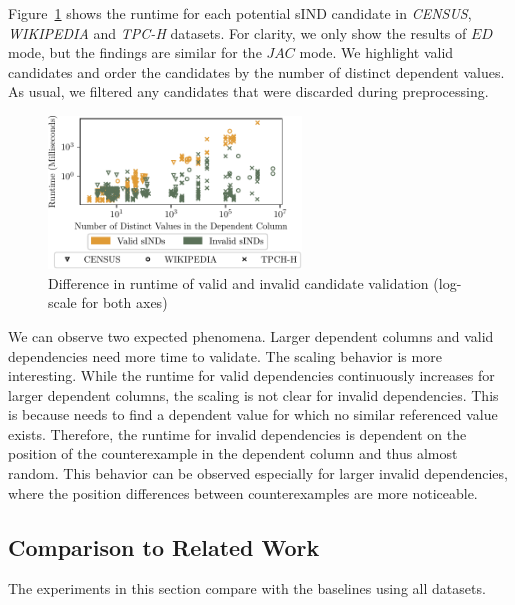 Figure~\ref{fig:eval:valid_dependencies} shows the runtime for each potential sIND candidate in \emph{CENSUS}, \emph{WIKIPEDIA} and \emph{TPC-H} datasets.
For clarity, we only show the results of $ED$ mode, but the findings are similar for the $JAC$ mode.
We highlight valid candidates and order the candidates by the number of distinct dependent values.
As usual, we filtered any candidates that were discarded during preprocessing.
\begin{figure}[ht]
    \centering
    \includegraphics[width=0.6\textwidth]{figures/valid_sIND_impact.pdf}
    \caption{Difference in runtime of valid and invalid candidate validation (log-scale for both axes)}
    \label{fig:eval:valid_dependencies}
\end{figure}

We can observe two expected phenomena.
Larger dependent columns and valid dependencies need more time to validate.
The scaling behavior is more interesting.
While the runtime for valid dependencies continuously increases for larger dependent columns, the scaling is not clear for invalid dependencies.
This is because \sawfish needs to find a dependent value for which no similar referenced value exists.
Therefore, the runtime for invalid dependencies is dependent on the position of the counterexample in the dependent column and thus almost random.
This behavior can be observed especially for larger invalid dependencies, where the position differences between counterexamples are more noticeable.

\subsection{Comparison to Related Work}

The experiments in this section compare \sawfish with the baselines using all datasets.


